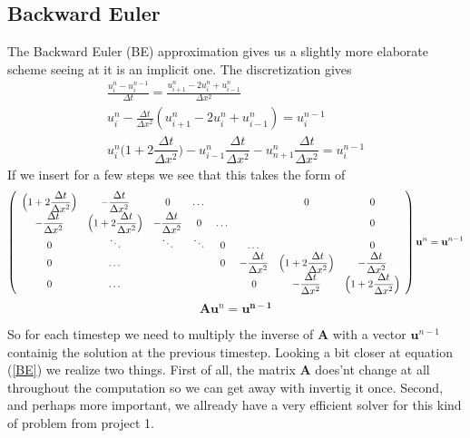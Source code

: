 \documentclass[a4paper,english, 10pt, twoside]{article}
\begin{document}
\subsection{Backward Euler}
The Backward Euler (BE) approximation gives us a slightly more elaborate scheme seeing at it is an implicit one. The discretization 
gives
\begin{align*}
 \frac{u^{n}_i-u^{n-1}_i}{\Delta t} = \frac{u^n_{i+1}-2u^n_i + u^n_{i-1}}{\Delta x^2} \\
 u^n_i -\frac{\Delta t}{\Delta x^2}\left(u^n_{i+1}-2u^n_i + u^n_{i-1}\right) = u^{n-1}_i \\
 u^n_i\Big(1+2\dfrac{\Delta t}{\Delta x^2}\Big) -u^n_{i-1}\dfrac{\Delta t}{\Delta x^2} - u^n_{n+1}\dfrac{\Delta t}{\Delta x^2} 
 = u^{n-1}_i
\end{align*}
If we insert for a few steps we see that this takes the form of
\begin{align}\label{BE}
 \left(\begin{array}{c c c c c c c c}
        \Big(1+2\dfrac{\Delta t}{\Delta x^2}\Big) & -\dfrac{\Delta t}{\Delta x^2} &0 &\dots & & &0 &0 \\
        -\dfrac{\Delta t}{\Delta x^2} & \Big(1+2\dfrac{\Delta t}{\Delta x^2}\Big) & -\dfrac{\Delta t}{\Delta x^2} &0 &\dots & & &0 \\
        0& \ddots & \ddots & \ddots & 0 & \dots &  &0\\
        0& \dots & & &0&-\dfrac{\Delta t}{\Delta x^2} & \Big(1+2\dfrac{\Delta t}{\Delta x^2}\Big) & -\dfrac{\Delta t}{\Delta x^2}\\
         0& \dots & && &0&-\dfrac{\Delta t}{\Delta x^2} & \Big(1+2\dfrac{\Delta t}{\Delta x^2}\Big) 
       \end{array}\right)\mathbf{u}^n = \mathbf{u}^{n-1} 
\end{align}
\begin{equation*}
 \mathbf{A}\mathbf{u}^n = \mathbf{u^{n-1}}
\end{equation*}

So for each timestep we need to multiply the inverse of $\mathbf{A}$ with a vector $\mathbf{u}^{n-1}$ containig the solution at 
the previous timestep. Looking a bit closer at equation (\ref{BE}) we realize two things. First of all, the matrix 
$\mathbf{A}$ does'nt change at all throughout the computation so we can get away with invertig it once. Second, and perhaps 
more important, we allready have a very efficient solver for this kind of problem from project 1.\\
\end{document}
